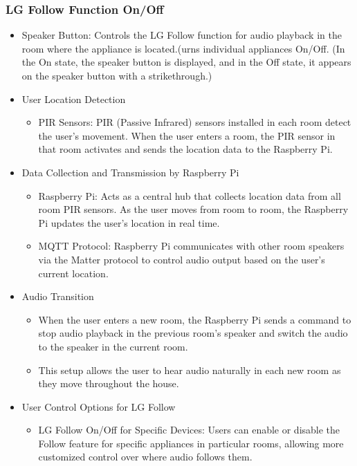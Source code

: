 \documentclass[conference]{IEEEtran}
\begin{document}
\subsubsection{LG Follow Function On/Off}
\begin{itemize}
    \item Speaker Button: Controls the LG Follow function for audio playback in the room where the appliance is located.(urns individual appliances On/Off. (In the On state, the speaker button is displayed, and in the Off state, it appears on the speaker button with a strikethrough.)\\
    \item User Location Detection
\begin{itemize}
    \item PIR Sensors: PIR (Passive Infrared) sensors installed in each room detect the user’s movement. When the user enters a room, the PIR sensor in that room activates and sends the location data to the Raspberry Pi.\\
\end{itemize}
\end{itemize}
\begin{itemize}
    \item Data Collection and Transmission by Raspberry Pi
\begin{itemize}
    \item Raspberry Pi: Acts as a central hub that collects location data from all room PIR sensors. As the user moves from room to room, the Raspberry Pi updates the user’s location in real time.\\
    \item MQTT Protocol: Raspberry Pi communicates with other room speakers via the Matter protocol to control audio output based on the user’s current location.\\
\end{itemize}
\end{itemize}
\begin{itemize}
    \item Audio Transition
\begin{itemize}
    \item When the user enters a new room, the Raspberry Pi sends a command to stop audio playback in the previous room’s speaker and switch the audio to the speaker in the current room.\\
    \item This setup allows the user to hear audio naturally in each new room as they move throughout the house.\\
\end{itemize}
\end{itemize}
\begin{itemize}
    \item User Control Options for LG Follow
\begin{itemize}
    \item LG Follow On/Off for Specific Devices: Users can enable or disable the Follow feature for specific appliances in particular rooms, allowing more customized control over where audio follows them.\\
\end{itemize}
\end{itemize}
\end{document}
